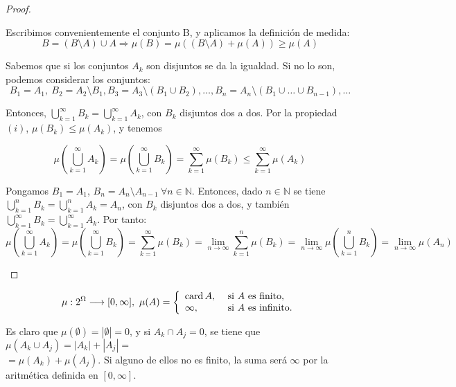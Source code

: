 \begin{proof}\hfill
\begin{nlist}
    \item Escribimos convenientemente el conjunto B, y aplicamos la definición de medida:
$$B= ( B\setminus A) \cup A \Longrightarrow \mu(B)= \mu ( (B\setminus A) + \mu(A)) \geq \mu(A)	$$
\item Sabemos que si los conjuntos $A_k$ son disjuntos se da la igualdad. Si no lo son,  podemos considerar los conjuntos:
$$B_1=A_1, \ B_2=A_2\setminus B_1, B_3 = A_3 \setminus (B_1 \cup B_2),\dots , B_n=A_n \setminus (B_1 \cup \dots \cup B_{n-1}), \dots $$

Entonces, $\bigcup_{k=1}^\infty B_k = \bigcup_{k=1}^\infty A_k$, con $B_k$  disjuntos dos a dos. Por la propiedad $(i)$,  $\mu (B_k) \leq \mu (A_k)$, y tenemos

  $$\mu \left( \bigcup_{k=1}^\infty A_k \right) = \mu \left( \bigcup_{k=1}^\infty B_k \right) = \sum_{k=1}^\infty \mu(B_k) \leq \sum_{k=1}^\infty \mu(A_k)$$

  \item Pongamos $B_1 = A_1$, $B_n = A_{n} \setminus A_{n-1} \ \forall n \in \mathbb{N}$. Entonces, dado $n \in \mathbb{N}$ se tiene $\bigcup_{k=1}^n B_k = \bigcup_{k=1}^nA_k=A_n$, con $B_k$  disjuntos dos a dos, y también $\bigcup_{k=1}^\infty B_k = \bigcup_{k=1}^\infty A_k$. Por tanto: $$\mu\left(\bigcup_{k=1}^\infty A_k \right) = \mu\left( \bigcup_{k=1}^\infty B_k \right) = \sum_{k=1}^\infty \mu(B_k) = \lim_{n\to\infty} \sum_{k=1}^n \mu(B_k) = \lim_{n\to\infty} \mu\left(\bigcup_{k=1}^n B_k \right) = \lim_{n\to\infty} \mu\left( A_n \right)$$
\end{nlist}
\end{proof}


\begin{ejemplo}
\[
 \mu: 2^\Omega\longrightarrow [0,\infty] , \
 \mu (A) = \left\{ \begin{array}{ll}
                               \text{card\,} A , & \text{ si } A \text{ es finito,}
                               \\
                               \infty , &  \text{ si } A \text{ es infinito.}
                              \end{array}
                              \right.
 \]

 Es claro que $\mu(\emptyset) = |\emptyset| = 0$, y si $A_k \cap A_j = 0$, se tiene que $\mu(A_k \cup A_j) = |A_k| + |A_j| = $\\ $= \mu(A_k) + \mu(A_j)$. Si alguno de ellos no es finito, la suma será $\infty$ por la aritmética definida en $[0,\infty]$.

\end{ejemplo}

